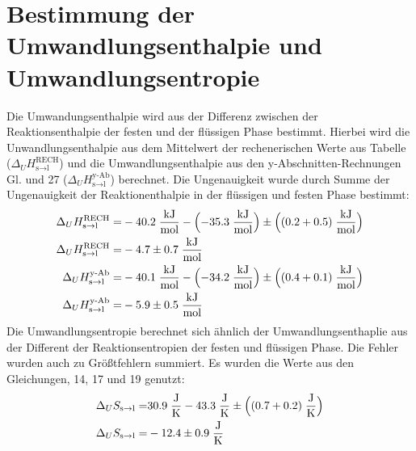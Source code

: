 \documentclass[12pt,a4paper,titlepage,headinclude,bibtotoc]{scrartcl}
\begin{document}
\section{Bestimmung der Umwandlungsenthalpie und Umwandlungsentropie}
Die Umwandungsenthalpie wird aus der Differenz zwischen der Reaktionsenthalpie der festen und der flüssigen Phase bestimmt. Hierbei wird die Unwandlungsenthalpie aus dem Mittelwert der rechenerischen Werte aus Tabelle ($\Delta_U H_{\text{s}\rightarrow\text{l}}^{\text{RECH}}$) und die Umwandlungsenthalpie aus den y-Abschnitten-Rechnungen Gl. und 27 ($\Delta_U H_{\text{s}\rightarrow\text{l}}^{\text{y-Ab}}$) berechnet. Die Ungenauigkeit wurde durch Summe der Ungenauigkeit der Reaktionenthalpie in der flüssigen und festen Phase bestimmt:
\begin{align}
\Delta_U H_{\text{s}\rightarrow\text{l}}^{\text{RECH}}=&  -40.2\;\frac{\text{kJ}}{\text{mol}} - \Bigl(-35.3\;\frac{\text{kJ}}{\text{mol}}\Bigr) \pm \Bigl((0.2+0.5)\;\frac{\text{kJ}}{\text{mol}}\Bigr)\\
\Delta_U H_{\text{s}\rightarrow\text{l}}^{\text{RECH}}=& -4.7\pm 0.7 \;\frac{\text{kJ}}{\text{mol}}\\
\Delta_U H_{\text{s}\rightarrow\text{l}}^{\text{y-Ab}}=&  -40.1\;\frac{\text{kJ}}{\text{mol}} - \Bigl(-34.2\;\frac{\text{kJ}}{\text{mol}}\Bigr) \pm \Bigl((0.4+0.1)\;\frac{\text{kJ}}{\text{mol}}\Bigr)\\
\Delta_U H_{\text{s}\rightarrow\text{l}}^{\text{y-Ab}}=& -5.9 \pm 0.5 \;\frac{\text{kJ}}{\text{mol}}
\end{align}
Die Umwandlungsentropie berechnet sich ähnlich der Umwandlungsenthaplie aus der Different der Reaktionsentropien der festen und flüssigen Phase. Die Fehler wurden auch zu Größtfehlern summiert. Es wurden die Werte aus den Gleichungen, 14, 17 und 19 genutzt:
\begin{align}
\Delta_U S_{\text{s}\rightarrow\text{l}}=&  30.9\;\frac{\text{J}}{\text{K}} - 43.3\;\frac{\text{J}}{\text{K}} \pm \Bigl((0.7+0.2)\;\frac{\text{J}}{\text{K}}\Bigr)\\
\Delta_U S_{\text{s}\rightarrow\text{l}}=& -12.4\pm0.9 \;\frac{\text{J}}{\text{K}}
\end{align}
\end{document}
